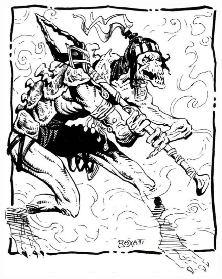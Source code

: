 \begin{figure}[t!]
\centering
\includegraphics[width=\columnwidth]{images/gith.png}
\WOTC
\end{figure}

